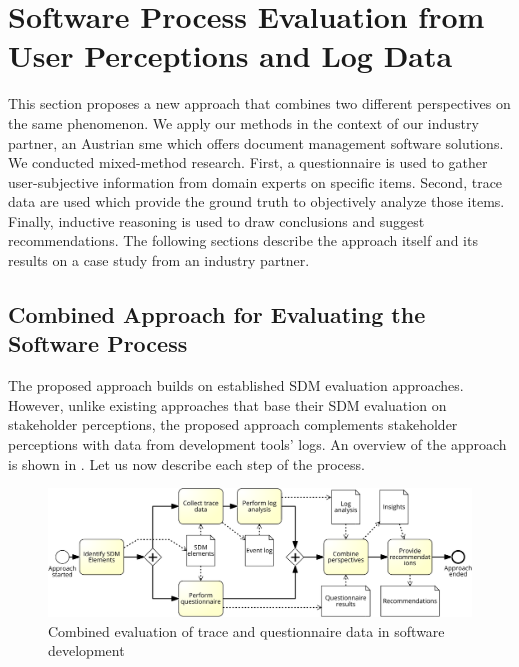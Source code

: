 \section{Software Process Evaluation from User Perceptions and Log Data}
\label{sec:combining-questionnaier-and-trace}


This section proposes a new approach that combines two different perspectives on the same phenomenon. We apply our methods in the context of our industry partner, an Austrian \gls{sme} which offers document management software solutions. We conducted mixed-method research. First, a questionnaire is used to gather user-subjective information from domain experts on specific items. Second, trace data are used which provide the ground truth to objectively analyze those items. Finally, inductive reasoning is used to draw conclusions and suggest recommendations. The following sections describe the approach itself and its results on a case study from an industry partner. 

\subsection{Combined Approach for Evaluating the Software Process}

The proposed approach builds on established SDM evaluation approaches. However, unlike existing approaches that base their SDM evaluation on stakeholder perceptions, the proposed approach complements stakeholder perceptions with data from development tools’ logs. An overview of the approach is shown in . Let us now describe each step of the process.

\begin{figure}
	\centering
	\includegraphics[width=\linewidth]{figures/SDM-process}
	\caption[Combined evaluation of trace and questionnaire data]{Combined evaluation of trace and questionnaire data in software development}
	\label{fig:sdm-process}
\end{figure}

